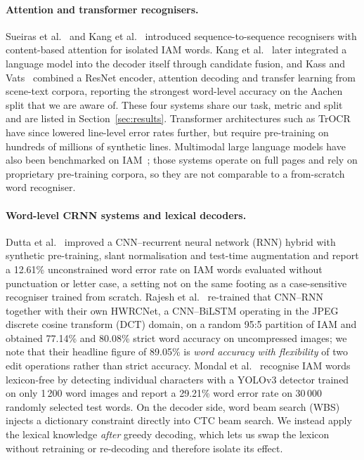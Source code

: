 \documentclass[conference]{IEEEtran}
\begin{document}
\paragraph{Attention and transformer recognisers.}
Sueiras et al.~\cite{sueiras2018offline} and Kang et
al.~\cite{kang2018convolve} introduced sequence-to-sequence
recognisers with content-based attention for isolated IAM words.
Kang et al.~\cite{kang2021candidate} later integrated a language model
into the decoder itself through candidate fusion, and Kass and
Vats~\cite{kass2022attentionhtr} combined a ResNet encoder,
attention decoding and transfer learning from scene-text corpora,
reporting the strongest word-level accuracy on the Aachen split that
we are aware of. These four systems share our task, metric and split
and are listed in Section~\ref{sec:results}. Transformer
architectures such as TrOCR~\cite{li2023trocr} have since lowered
line-level error rates further, but require pre-training on hundreds
of millions of synthetic lines. Multimodal large language models have
also been benchmarked on IAM~\cite{crosilla2025llmhtr}; those systems
operate on full pages and rely on proprietary pre-training corpora, so
they are not comparable to a from-scratch word recogniser.

\paragraph{Word-level CRNN systems and lexical decoders.}
Dutta et al.~\cite{dutta2018improving} improved a CNN--recurrent
neural network (RNN) hybrid with synthetic pre-training, slant
normalisation and test-time augmentation and report a 12.61\%
unconstrained word error rate on IAM words evaluated without
punctuation or letter case, a setting not on the same footing as a
case-sensitive recogniser trained from scratch. Rajesh et
al.~\cite{rajesh2022hwrcnet} re-trained that CNN--RNN together with
their own HWRCNet, a CNN--BiLSTM operating in the JPEG discrete cosine
transform (DCT) domain, on a random 95:5 partition of IAM and obtained
77.14\% and 80.08\% strict word accuracy on uncompressed images; we
note that their headline figure of 89.05\% is \emph{word accuracy with
flexibility} of two edit operations rather than strict accuracy.
Mondal et al.~\cite{mondal2022yolo} recognise IAM words lexicon-free
by detecting individual characters with a YOLOv3 detector trained on
only 1\,200 word images and report a 29.21\% word error rate on
30\,000 randomly selected test words. On the decoder side, word beam
search (WBS)~\cite{scheidl2018wbs} injects a dictionary constraint
directly into CTC beam search. We instead apply the lexical knowledge
\emph{after} greedy decoding, which lets us swap the lexicon without
retraining or re-decoding and therefore isolate its effect.
\end{document}
